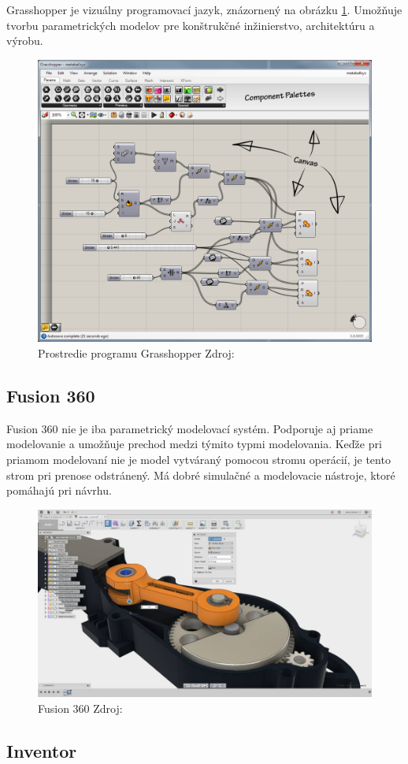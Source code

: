 Grasshopper je vizuálny programovací jazyk, znázornený na obrázku \ref{fig:Grasshopper}.
Umožňuje tvorbu parametrických modelov pre konštrukčné inžinierstvo, architektúru a výrobu.

\begin{figure}[H]
    \centering
    \includegraphics[width = 0.5\linewidth]{obrazky-figures/programs/Grasshopper_MainWindow.png}
    \caption{Prostredie programu Grasshopper Zdroj: \cite{rutten_2011} }
    \label{fig:Grasshopper}
\end{figure}


\subsection*{Fusion 360}
Fusion 360 nie je iba  parametrický modelovací systém. Podporuje aj priame modelovanie a umožňuje prechod medzi týmito typmi modelovania. Keďže pri priamom modelovaní nie je model vytváraný pomocou stromu operácií, je tento strom pri prenose odstránený. Má dobré simulačné a modelovacie nástroje, ktoré pomáhajú pri návrhu.

\begin{figure}[H]
    \centering
    \includegraphics[width = 0.5\linewidth]{obrazky-figures/programs/Fusion.jpg}
    \caption{Fusion 360 Zdroj: \cite{gaget_2018} }
    \label{fig:Fusion}
\end{figure}

\subsection*{Inventor}


